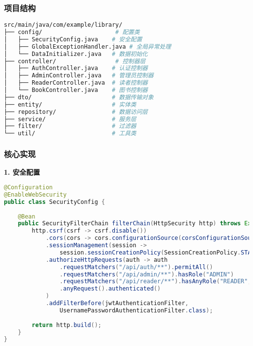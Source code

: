 \documentclass[12pt,a4paper]{article}
\begin{document}
\subsubsection{项目结构}
\begin{lstlisting}[language=bash]
src/main/java/com/example/library/
├── config/                     # 配置类
│   ├── SecurityConfig.java    # 安全配置
│   ├── GlobalExceptionHandler.java # 全局异常处理
│   └── DataInitializer.java   # 数据初始化
├── controller/                 # 控制器层
│   ├── AuthController.java    # 认证控制器
│   ├── AdminController.java   # 管理员控制器
│   ├── ReaderController.java  # 读者控制器
│   └── BookController.java    # 图书控制器
├── dto/                       # 数据传输对象
├── entity/                    # 实体类
├── repository/                # 数据访问层
├── service/                   # 服务层
├── filter/                    # 过滤器
└── util/                      # 工具类
\end{lstlisting}

\subsubsection{核心实现}

\textbf{1. 安全配置}
\begin{lstlisting}[language=java]
@Configuration
@EnableWebSecurity
public class SecurityConfig {
    
    @Bean
    public SecurityFilterChain filterChain(HttpSecurity http) throws Exception {
        http.csrf(csrf -> csrf.disable())
            .cors(cors -> cors.configurationSource(corsConfigurationSource()))
            .sessionManagement(session -> 
                session.sessionCreationPolicy(SessionCreationPolicy.STATELESS))
            .authorizeHttpRequests(auth -> auth
                .requestMatchers("/api/auth/**").permitAll()
                .requestMatchers("/api/admin/**").hasRole("ADMIN")
                .requestMatchers("/api/reader/**").hasAnyRole("READER", "ADMIN")
                .anyRequest().authenticated()
            )
            .addFilterBefore(jwtAuthenticationFilter, 
                UsernamePasswordAuthenticationFilter.class);
        
        return http.build();
    }
}
\end{lstlisting}
\end{document}
